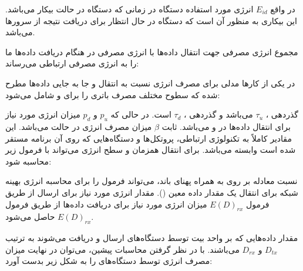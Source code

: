 در واقع $E_{id}$ انرژی مورد استفاده دستگاه  در زمانی که دستگاه در حالت
بیکار می‌باشد. این بیکاری به منظور آن است که دستگاه  در حال انتظار برای
دریافت نتیجه از سرور‌ها می‌باشد.


مجموع انرژی مصرفی جهت انتقال داده‌ها با انرژی مصرفی در هنگام دریافت داده‌ها ما
را به انرژی مصرفی ارتباطی می‌رساند:


در یکی از کار‌ها \cite{huang2012close} مدلی برای مصرف انرژی نسبت به انتقال و جا
به جایی داده‌ها مطرح شده که سطوح مختلف مصرف باتری را برای  و
 شامل می‌شود:


گذردهی ، $\tau_u$ می‌باشد و گذردهی ، $\tau_d$ است. در
حالی که $p_u$ و $p_d$ میزان انرژی مورد نیاز برای انتقال داده‌ها در  و
 می‌باشد. ثابت $\beta$ میزان مصرف انرژی در حالت  می‌باشد.
این مقادیر کاملاً به تکنولوژی ارتباطی، پروتکل‌ها و دستگاه‌هایی که روی آن برنامه
مستقر شده است وابسته می‌‌باشد. برای انتقال همزمان  و 
سطح انرژی می‌تواند با فرمول زیر محاسبه شود:


نسبت معادله  بر روی  به همراه پهنای باند، می‌تواند فرمول
را برای محاسبه انرژی بهینه شبکه برای انتقال یک مقدار داده معین (). مقدار انرژی مورد نیاز برای ارسال از طریق فرمول $E(D)_{rx}$ میزان انرژی
مورد نیاز برای دریافت داده‌ها از طریق فرمول $E(D)_{rx}$ حاصل می‌شود.


مقدار داده‌هایی که بر واحد بیت توسط دستگاه‌های  ارسال و دریافت می‌شوند
به ترتیب $D_{tx}$ و $D_{rx}$ می‌باشند. با در نظر گرفتن محاسبات پیشین، می‌توان در
نهایت میزان مصرف انرژی توسط دستگاه‌های  را به شکل زیر بدست آورد:


